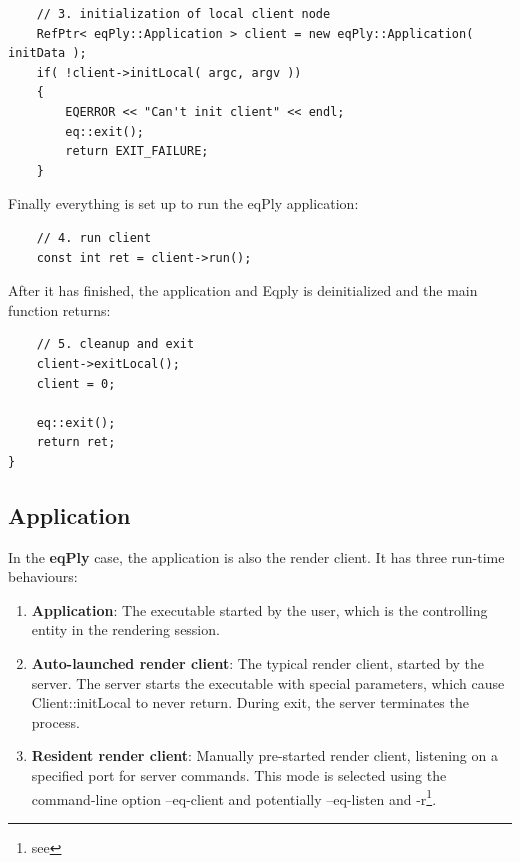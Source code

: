 \documentclass[10pt,a4]{scrartcl}
\begin{document}
{\footnotesize\begin{lstlisting}
    // 3. initialization of local client node
    RefPtr< eqPly::Application > client = new eqPly::Application( initData );
    if( !client->initLocal( argc, argv ))
    {
        EQERROR << "Can't init client" << endl;
        eq::exit();
        return EXIT_FAILURE;
    }
\end{lstlisting}}%

Finally everything is set up to run the \textsf{eqPly} application:

{\footnotesize\begin{lstlisting}
    // 4. run client
    const int ret = client->run();
\end{lstlisting}}

After it has finished, the application and Eqply is deinitialized and
the \textsf{main} function returns:

{\footnotesize\begin{lstlisting}
    // 5. cleanup and exit
    client->exitLocal();
    client = 0;

    eq::exit();
    return ret;
}
\end{lstlisting}}


\subsection{Application}

In the \textbf{eqPly} case, the application is also the render client. It has
three run-time behaviours:

\begin{enumerate}
  \item \textbf{Application}: The executable started by the user, which
    is the controlling entity in the rendering session.
  \item \textbf{Auto-launched render client}: The typical render client,
    started by the server. The server starts the executable with special
    parameters, which cause \textsf{Client::initLocal} to never
    return. During exit, the server terminates the process.
  \item \textbf{Resident render client}: Manually pre-started render
    client, listening on a specified port for server commands. This mode
    is selected using the command-line option \textsf{--eq-client} and
    potentially \textsf{--eq-listen} and \textsf{-r}\footnote{see }.
\end{enumerate}
\end{document}
